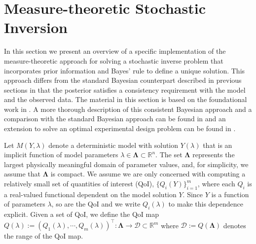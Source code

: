 \section{Measure-theoretic Stochastic Inversion} \label{uq:cbayes}

\newcommand{\pspace}{\mathbf{\Lambda}}
\newcommand{\dspace}{\mathbf{\mathcal{D}}}
\newcommand{\pmeas}{\mu_{\pspace}}
\newcommand{\dmeas}{\mu_{\dspace}}
\newcommand{\pborel}{\mathcal{B}_{\pspace}}
\newcommand{\dborel}{\mathcal{B}_{\dspace}}
\newcommand{\priormeas}{P_{\pspace}^{\text{prior}}}
\newcommand{\postmeas}{P_{\pspace}^{\text{post}}}
\newcommand{\priordens}{\pi_{\pspace}^{\text{prior}}}
\newcommand{\postdens}{\pi_{\pspace}^{\text{post}}}
\newcommand{\pfpriormeas}{P_{\dspace}^{Q(\text{prior})}}
\newcommand{\pfpostmeas}{P_{\dspace}^{Q(\text{post})}}
\newcommand{\pfpriordens}{\pi_{\dspace}^{Q(\text{prior})}}
\newcommand{\pfpostdens}{\pi_{\dspace}^{Q(\text{post})}}
\newcommand{\obsmeas}{P_{\dspace}^{\text{obs}}}
\newcommand{\obsdens}{\pi_{\dspace}^{\text{obs}}}
\newcommand{\postdenssbayes}{\tilde{\pi}_{\pspace}^{\text{post}}}


In this section we present an overview of a specific implementation of the measure-theoretic approach for solving a stochastic inverse problem
that incorporates prior information and Bayes' rule to define a unique solution.
This approach differs from the standard Bayesian counterpart described in previous sections in that the posterior satisfies a consistency requirement with the model and the observed data.
The material in this section is based on the foundational work in \cite{Butler2017, Walsh2017}.
A more thorough description of this consistent Bayesian approach and a comparison with the standard Bayesian approach can be found in \cite{Butler2017} and an extension to solve an optimal experimental design problem can be found in \cite{Walsh2017}.

Let $M(Y,\lambda)$ denote a deterministic model with solution $Y(\lambda)$ that is an implicit function of model parameters $\lambda\in\pspace \subset \mathbb{R}^n$.
The set $\pspace$ represents the largest physically meaningful domain of parameter values, and, for simplicity, we assume that $\pspace$ is compact.
We assume we are only concerned with computing  a relatively small set of quantities of interest (QoI), $\{Q_i(Y)\}_{i=1}^m$, where each $Q_i$ is a real-valued functional dependent on the model solution $Y$.
Since $Y$ is a function of parameters $\lambda$, so are the QoI and we write $Q_i(\lambda)$ to make this dependence explicit.
Given a set of QoI, we define the QoI map $Q(\lambda) := (Q_1(\lambda), \cdots, Q_m(\lambda))^\top:\pspace\to\dspace\subset\mathbb{R}^m$ where $\dspace  := Q(\pspace)$ denotes the range of the QoI map.

